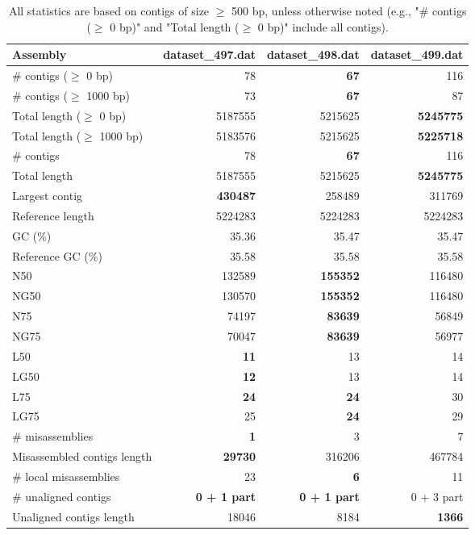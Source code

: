 \documentclass[12pt,a4paper]{article}
\begin{document}
\begin{table}[ht]
\begin{center}
\caption{All statistics are based on contigs of size $\geq$ 500 bp, unless otherwise noted (e.g., "\# contigs ($\geq$ 0 bp)" and "Total length ($\geq$ 0 bp)" include all contigs).}
\begin{tabular}{|l*{3}{|r}|}
\hline
Assembly & dataset\_497.dat & dataset\_498.dat & dataset\_499.dat \\ \hline
\# contigs ($\geq$ 0 bp) & 78 & {\bf 67} & 116 \\ \hline
\# contigs ($\geq$ 1000 bp) & 73 & {\bf 67} & 87 \\ \hline
Total length ($\geq$ 0 bp) & 5187555 & 5215625 & {\bf 5245775} \\ \hline
Total length ($\geq$ 1000 bp) & 5183576 & 5215625 & {\bf 5225718} \\ \hline
\# contigs & 78 & {\bf 67} & 116 \\ \hline
Total length & 5187555 & 5215625 & {\bf 5245775} \\ \hline
Largest contig & {\bf 430487} & 258489 & 311769 \\ \hline
Reference length & 5224283 & 5224283 & 5224283 \\ \hline
GC (\%) & 35.36 & 35.47 & 35.47 \\ \hline
Reference GC (\%) & 35.58 & 35.58 & 35.58 \\ \hline
N50 & 132589 & {\bf 155352} & 116480 \\ \hline
NG50 & 130570 & {\bf 155352} & 116480 \\ \hline
N75 & 74197 & {\bf 83639} & 56849 \\ \hline
NG75 & 70047 & {\bf 83639} & 56977 \\ \hline
L50 & {\bf 11} & 13 & 14 \\ \hline
LG50 & {\bf 12} & 13 & 14 \\ \hline
L75 & {\bf 24} & {\bf 24} & 30 \\ \hline
LG75 & 25 & {\bf 24} & 29 \\ \hline
\# misassemblies & {\bf 1} & 3 & 7 \\ \hline
Misassembled contigs length & {\bf 29730} & 316206 & 467784 \\ \hline
\# local misassemblies & 23 & {\bf 6} & 11 \\ \hline
\# unaligned contigs & {\bf 0 + 1 part} & {\bf 0 + 1 part} & 0 + 3 part \\ \hline
Unaligned contigs length & 18046 & 8184 & {\bf 1366} \\ \hline

\end{tabular}
\end{center}
\end{table}
\end{document}
